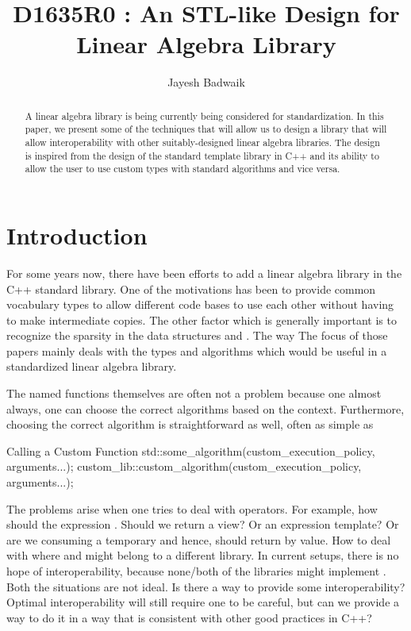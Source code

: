 \documentclass[oneside,11pt,a4paper]{jbarticle}
\subtitle{}
\title{D1635R0 : An STL-like Design for Linear Algebra Library}
\author{Jayesh Badwaik}
\begin{document}
\maketitle[\value{page}]
\begin{abstract}
  A linear algebra library is being currently being considered for
  standardization.  In this paper, we present some of the techniques that will
  allow us to design a library that will allow interoperability with other
  suitably-designed linear algebra libraries. The design is inspired from the
  design of the standard template library in C++ and its ability to allow the
  user to use custom types with standard algorithms and vice versa.
\end{abstract}

\section{Introduction}
For some years now, there have been efforts to add a linear algebra library in
the C++ standard library.  One of the motivations has been to provide
common vocabulary types to allow different code bases to use each other without
having to make intermediate copies. The other factor which is generally
important is to recognize the sparsity in the data structures and . The way
The focus of those papers mainly
deals with the types and algorithms which would be useful in a standardized
linear algebra library.


The named functions themselves are often not a problem because one almost
always, one can choose the correct algorithms based on the context. Furthermore,
choosing the correct algorithm is straightforward as well, often as simple as
\begin{codecpp}{Calling a Custom Function}
  std::some_algorithm(custom_execution_policy, arguments...);
  custom_lib::custom_algorithm(custom_execution_policy, arguments...);
\end{codecpp}

The problems arise when one tries to deal with operators. For example, how
should the expression . Should we return a view? Or an
expression template? Or are we consuming a temporary and hence, should return by
value. How to deal with  where  and 
might belong to a different library. In current setups, there is no hope of
interoperability, because none/both of the libraries might implement
. Both the situations are not ideal.
Is there a way to provide some interoperability? Optimal interoperability will
still require one to be careful, but can we provide a way to do it in a way that
is consistent with other good practices in C++?
\end{document}
